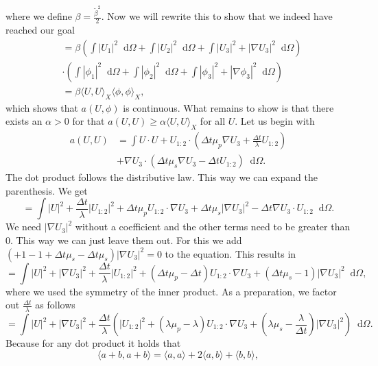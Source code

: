 \documentclass[12pt,a4paper,twoside, open=right]{scrreprt}
\theoremstyle{definition}
\theoremstyle{plain}
\newcommand{\abs}[1]{\left\vert #1\right\vert}
\newcommand{\D}{\mathop{}\!\mathrm{d}}
\begin{document}
where we define $\beta=\frac{\tilde\beta^2}{2}$. Now we will rewrite this to show that we indeed have reached our goal
\begin{align}
    &=\beta\left(\int\abs{U_1}^2\D\Omega +\int\abs{U_2}^2\D\Omega +\int\abs{U_3}^2+\abs{\nabla U_3}^2\D\Omega \right)\\ &\cdot\left(\int\abs{\phi_1}^2\D\Omega +\int\abs{\phi_2}^2\D\Omega +\int\abs{\phi_3}^2+\abs{\nabla \phi_3}^2\D\Omega \right)\\
    &=\beta \langle U,U\rangle_X \langle \phi,\phi\rangle_X,
\end{align} which shows that $a(U,\phi)$ is continuous. What remains to show is that there exists an $\alpha>0$ for that $a(U,U)\ge \alpha\langle U,U\rangle_X$ for all $U$. Let us begin with
\begin{align}
    a(U,U)&=\int U\cdot U+U_{1:2}\cdot\left(\Delta t\mu_p\nabla U_3+\frac{\Delta t}{\lambda}U_{1:2}\right)\\
    &+\nabla U_3\cdot\left(\Delta t\mu_s\nabla U_3 -\Delta tU_{1:2}\right)\D\Omega.
\end{align}
The dot product follows the distributive law. This way we can expand the parenthesis. We get
\begin{equation}
    =\int\abs{U}^2+\frac{\Delta t}{\lambda}\abs{U_{1:2}}^2+\Delta t\mu_p U_{1:2}\cdot\nabla U_3
    +\Delta t\mu_s\abs{\nabla U_3}^2-\Delta t\nabla U_3\cdot U_{1:2}\D\Omega.
\end{equation} 
We need $\abs{\nabla U_3}^2$ without a coefficient and the other terms need to be greater than 0. This way we can just leave them out. For this we add $(+1-1+\Delta t\mu_s -\Delta t\mu_s)\abs{\nabla U_3}^2=0$ to the equation. This results in 
\begin{equation}
     =\int\abs{U}^2+\abs{\nabla U_3}^2+\frac{\Delta t}{\lambda}\abs{U_{1:2}}^2+(\Delta t\mu_p-\Delta t) U_{1:2}\cdot\nabla U_3
    +(\Delta t\mu_s-1)\abs{\nabla U_3}^2\D\Omega,
\end{equation} 
where we used the symmetry of the inner product. As a preparation, we factor out $\frac{\Delta t}{\lambda}$ as follows 
\begin{equation}
    =\int\abs{U}^2+\abs{\nabla U_3}^2+\frac{\Delta t}{\lambda}\left(\abs{U_{1:2}}^2+(\lambda\mu_p-\lambda)U_{1:2}\cdot\nabla U_3+(\lambda\mu_s-\frac{\lambda}{\Delta t})\abs{\nabla U_3}^2 \right)\D\Omega.\label{eq:ref1}
\end{equation}
Because for any dot product it holds that
\begin{equation}
    \langle a+b,a+b\rangle=\langle a,a\rangle+2\langle a,b\rangle + \langle b,b\rangle,
\end{equation}
\end{document}
